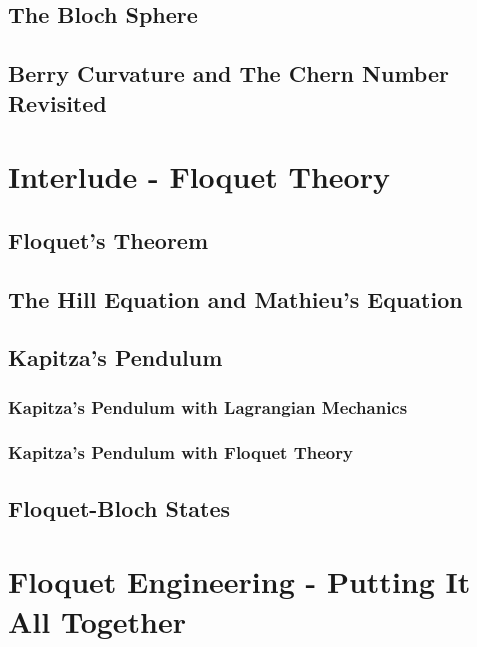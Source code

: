\documentclass[a4paper]{article}
\begin{document}
    \subsection{The Bloch Sphere}
    \subsection{Berry Curvature and The Chern Number Revisited}
    \section{Interlude - Floquet Theory}
    \subsection{Floquet's Theorem}
    \subsection{The Hill Equation and Mathieu's Equation}
    \subsection{Kapitza's Pendulum}
    \subsubsection{Kapitza's Pendulum with Lagrangian Mechanics}
    \subsubsection{Kapitza's Pendulum with Floquet Theory}
    \subsection{Floquet-Bloch States}
    \section{Floquet Engineering - Putting It All Together}
\end{document}

